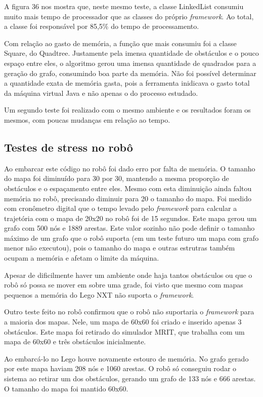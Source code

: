 A figura 36 nos mostra que, neste mesmo teste, a classe LinkedList consumiu muito mais tempo de processador que as classes do próprio \textit{framework}. Ao total, a classe foi responsável por 85,5\% do tempo de processamento.

Com relação ao gasto de memória, a função que mais consumiu foi a classe Square, do Quadtree. Justamente pela imensa quantidade de obstáculos e o pouco espaço entre eles, o algoritmo gerou uma imensa quantidade de quadrados para a geração do grafo, consumindo boa parte da memória. Não foi possível determinar a quantidade exata de memória gasta, pois a ferramenta inidicava o gasto total da máquina virtual Java e não apenas o do processo estudado.

Um segundo teste foi realizado com o mesmo ambiente e os resultados foram os mesmos, com poucas mudanças em relação ao tempo.

\subsection{Testes de stress no robô}

Ao embarcar este código no robô foi dado erro por falta de memória. O tamanho do mapa foi diminuído para 30 por 30, mantendo a mesma proporção de obstáculos e o espaçamento entre eles. Mesmo com esta diminuição ainda faltou memória no robô, precisando diminuir para 20 o tamanho do mapa. Foi medido com cronômetro digital que o tempo levado pelo \textit{framework} para calcular a trajetória com o mapa de 20x20 no robô foi de 15 segundos. Este mapa gerou um grafo com 500 nós e 1889 arestas. Este valor sozinho não pode definir o tamanho máximo de um grafo que o robô suporta (em um teste futuro um mapa com grafo menor não executou), pois o tamanho do mapa e outras estrutras também ocupam a memória e afetam o limite da máquina.

Apesar de dificilmente haver um ambiente onde haja tantos obstáculos ou que o robô só possa se mover em sobre uma grade, foi visto que mesmo com mapas pequenos a memória do Lego NXT não suporta o \textit{framework}. 

Outro teste feito no robô confirmou que o robô não suportaria o \textit{framework} para a maioria dos mapas. Nele, um mapa de 60x60 foi criado e inserido apenas 3 obstáculos. Este mapa foi retirado do simulador MRIT, que trabalha com um mapa de 60x60 e três obstáculos inicialmente. 

Ao embarcá-lo no Lego houve novamente estouro de memória. No grafo gerado por este mapa haviam 208 nós e 1060 arestas. O robô só conseguiu rodar o sistema ao retirar um dos obstáculos, gerando um grafo de 133 nós e 666 arestas. O tamanho do mapa foi mantido 60x60.

